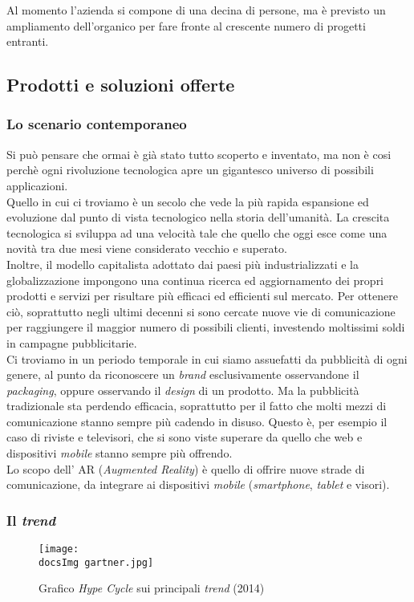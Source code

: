 Al momento l'azienda si compone di una decina di persone, ma \`e previsto un ampliamento dell'organico per fare fronte al crescente numero di progetti entranti.

\subsection{Prodotti e soluzioni offerte}
\subsubsection{Lo scenario contemporaneo}
Si pu\`o pensare che ormai \`e gi\`a stato tutto scoperto e inventato, ma non \`e cosi perch\`e ogni rivoluzione tecnologica apre un gigantesco universo di possibili applicazioni. 
\\
Quello in cui ci troviamo \`e un secolo che vede la pi\`u rapida espansione ed evoluzione dal punto di vista tecnologico nella storia dell'umanit\`a. La crescita tecnologica si sviluppa ad una velocit\`a tale che quello che oggi esce come una novit\`a tra due mesi viene considerato vecchio e superato.
\\
Inoltre, il modello capitalista adottato dai paesi pi\`u industrializzati e la globalizzazione impongono una continua ricerca ed aggiornamento dei propri prodotti e servizi per risultare pi\`u efficaci ed efficienti sul mercato. Per ottenere ci\`o, soprattutto negli ultimi decenni si sono cercate nuove vie di comunicazione per raggiungere il maggior numero di possibili clienti, investendo moltissimi soldi in campagne pubblicitarie.
\\
Ci troviamo in un periodo temporale in cui siamo assuefatti da pubblicit\`a di ogni genere, al punto da riconoscere un \textit{brand} esclusivamente osservandone il \textit{packaging}, oppure osservando il \textit{design} di un prodotto.
Ma la pubblicit\`a tradizionale sta perdendo efficacia, soprattutto per il fatto che molti mezzi di comunicazione stanno sempre pi\`u cadendo in disuso. Questo \`e, per esempio il caso di riviste e televisori, che si sono viste superare da quello che web e dispositivi \textit{mobile} stanno sempre pi\`u offrendo.
\\
Lo scopo dell' AR (\textit{Augmented Reality}) \`e quello di offrire nuove strade di comunicazione, da integrare ai dispositivi \textit{mobile} (\textit{smartphone}, \textit{tablet} e visori).

\subsubsection{Il \textit{trend}}
\begin{figure}[H]
	\centering
	\texttt{[image: \\docsImg gartner.jpg]}
	\caption{Grafico \textit{Hype Cycle} sui principali \textit{trend} (2014)}
	\label{fig: Grafico Hype Cycle sui principali trend (2014)}
\end{figure}

